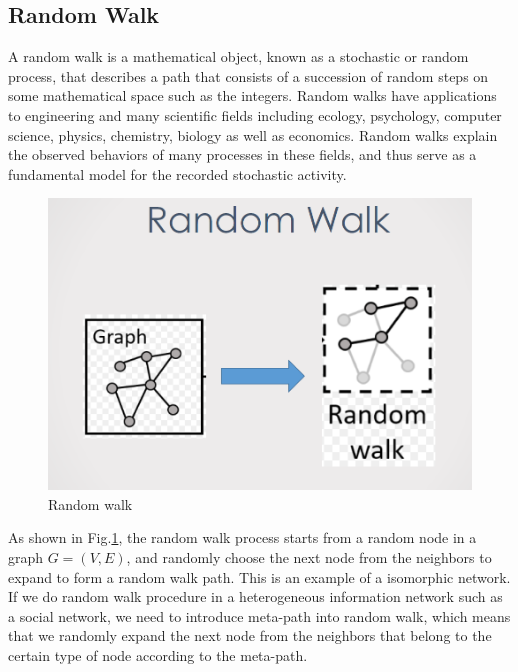 \documentclass{acmtog} %
\begin{document}
\subsection{Random Walk}
A random walk is a mathematical object, known as a stochastic or random process, that describes a path that consists of a succession of random steps on some mathematical space such as the integers\cite{wikipediarw}. Random walks have applications to engineering and many scientific fields including ecology, psychology, computer science, physics, chemistry, biology as well as economics. Random walks explain the observed behaviors of many processes in these fields, and thus serve as a fundamental model for the recorded stochastic activity.
\begin{figure}[H]
  \centering
  \includegraphics[width=0.7\linewidth]{rw.png}
  \caption{Random walk}
  \label{3}
\end{figure}
\par As shown in Fig.\ref{3}, the random walk process starts from a random node in a graph $G = (V, E)$, and randomly choose the next node from the neighbors to expand to form a random walk path. This is an example of a isomorphic network. If we do random walk procedure in a heterogeneous information network such as a social network, we need to introduce meta-path into random walk, which means that we randomly expand the next node from the neighbors that belong to the certain type of node according to the meta-path.
\par
\end{document}
